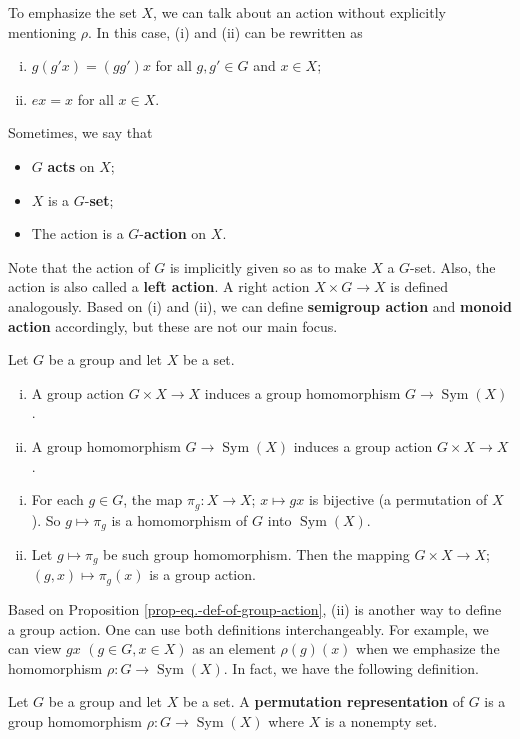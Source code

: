 \begin{remark}
	To emphasize the set $X$, we can talk about an action without explicitly mentioning $\rho$. In this case, (i) and (ii) can be rewritten as 
\begin{enumerate}[(i)]
	\item $g(g'x) = (gg')x$ for all $g,g'\in G$ and $x\in X$;
	\item $ex =x$ for all $x\in X$.
\end{enumerate}
Sometimes, we say that
\begin{itemize}
	\item $G$ \textbf{acts} on $X$;
	\item $X$ is a $G$-\textbf{set};
	\item The action is a $G$-\textbf{action} on $X$.
\end{itemize}  Note that the action of $G$ is implicitly given so as to make $X$ a $G$-set. Also, the action is also called a \textbf{left action}. A right action $X\times G\rightarrow X$ is defined analogously. Based on (i) and (ii), we can define \textbf{semigroup action} and \textbf{monoid action} accordingly, but these are not our main focus.


\begin{proposition} \label{prop-eq.-def-of-group-action} Let $G$ be a group and let $X$ be a set.
	\begin{enumerate}[(i)]
		\item A group action $G\times X\rightarrow X$ induces a group homomorphism $G\rightarrow \operatorname{Sym}(X)$.
		\item A group homomorphism $G\rightarrow \operatorname{Sym}(X)$ induces a group action $G\times X\rightarrow X$.
	\end{enumerate}
\end{proposition}
\begin{sketch}
	\begin{enumerate}[(i)]
		\item For each $g\in G$, the map $\pi_g:X\rightarrow X$; $x\mapsto gx$ is bijective (a permutation of $X$). So $g\mapsto \pi_g$ is a homomorphism of $G$ into $\operatorname{Sym}(X)$.
		\item Let $g\mapsto \pi_g$ be such group homomorphism. Then the mapping $G\times X\rightarrow X$; $(g,x) \mapsto \pi_g(x)$ is a group action. \qedhere
	\end{enumerate}
\end{sketch}
Based on Proposition \ref{prop-eq.-def-of-group-action}, (ii) is another way to define a group action. One can use both definitions interchangeably. For example, we can view $gx$ $(g\in G,x\in X)$ as an element $\rho(g)(x)$ when we emphasize the homomorphism $\rho:G\rightarrow \operatorname{Sym}(X)$. In fact, we have the following definition.
\begin{definition}
	Let $G$ be a group and let $X$ be a set.  A \textbf{permutation representation} of $G$ is a group homomorphism  $\rho:G\rightarrow \operatorname{Sym}(X)$ where $X$ is a nonempty set.
\end{definition}


\end{remark}
